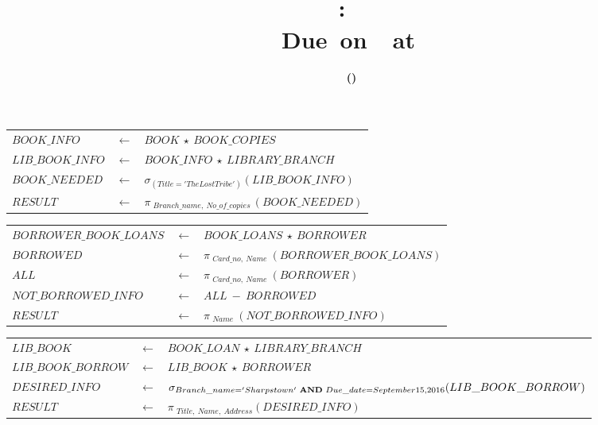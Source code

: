 \documentclass[10pt,letterpaper,titlepage,en-US]{article}
\title{
    \vspace{2in}
    \textmd{\textbf{\hmwkClassName \\\hmwkClass:\ \hmwkTitle}}\\
    \normalsize\vspace{0.1in}\small{Due\ on\ \DTMusedate{DueDate}\ at \DTMusetime{DueDate} }\\
    \vspace{0.1in}\large{\textit{\hmwkClassInstructor}}
    \vspace{3in}
}
\author{\textbf{\hmwkAuthorName\ \footnotesize{(\hmwkAuthorNetID)}} \\ \hmwkAuthorUTDEmail}
\date{}
\begin{document}
\maketitle


\pagebreak

\begin{homeworkProblem} %

\begin{tabular}{lll}
$BOOK\_INFO$ & $\leftarrow $ & $ BOOK \ \star \ BOOK\_COPIES$ \\
$LIB\_BOOK\_INFO$ & $\leftarrow $ & $ BOOK\_INFO \ \star \ LIBRARY\_BRANCH$ \\
$BOOK\_NEEDED$ & $\leftarrow $ & $ \sigma_{(Title = 'The Lost Tribe')}(LIB\_BOOK\_INFO)$ \\
$RESULT$ & $\leftarrow $ & $ \pi\ _{Branch\_name,\ No\_of\_copies\ }( BOOK\_NEEDED )$ \\
\end{tabular}

\end{homeworkProblem}

\begin{homeworkProblem}%

\begin{tabular}{lll}
$ BORROWER\_BOOK\_LOANS $ & $ \leftarrow $ & $  BOOK\_LOANS \ \star \ BORROWER $ \\
$ BORROWED$ & $ \leftarrow $ & $  \pi\ _{Card\_no,\ Name}\ (BORROWER\_BOOK\_LOANS) $ \\
$ ALL $ & $ \leftarrow $ & $  \pi\ _{Card\_no,\ Name}\ (BORROWER) $ \\
$ NOT\_BORROWED\_INFO $ & $ \leftarrow $ & $  ALL\ -\ BORROWED $ \\
$ RESULT$ & $ \leftarrow $ & $  \pi\ _{Name}\ (NOT\_BORROWED\_INFO) $ \\
\end{tabular}

\end{homeworkProblem}

\begin{homeworkProblem} %

\begin{tabular}{lll}
$ LIB\_BOOK $ & $ \leftarrow $ & $  BOOK\_LOAN \ \star \ LIBRARY\_BRANCH $ \\
$ LIB\_BOOK\_BORROW $ & $ \leftarrow $ & $  LIB\_BOOK \ \star \ BORROWER $ \\
$ DESIRED\_INFO $ & $ \leftarrow $ & $  \sigma _{Branch\_name = 'Sharpstown' \text{ \textbf{AND} } Due\_date = September 15, 2016} (LIB\_BOOK\_BORROW) $ \\
$ RESULT$ & $ \leftarrow $ & $  \pi\ _{Title,\ Name,\ Address} (DESIRED\_INFO) $ \\
\end{tabular}

\end{homeworkProblem}
\end{document}
